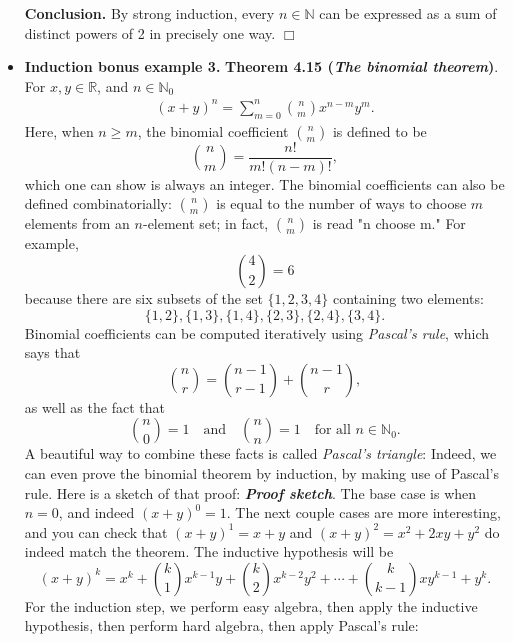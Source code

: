 \documentclass{report}
\begin{document}
\begin{itemize}
            \bigbreak \noindent 
            \textbf{Conclusion.} By strong induction, every \( n \in \mathbb{N} \) can be expressed as a sum of distinct powers of 2 in precisely one way. \(\Box\)
        \item \textbf{Induction bonus example 3.}
            \bigbreak \noindent 
            \textbf{Theorem 4.15 (\textit{The binomial theorem})}. For $x,y \in \mathbb{R}$, and $n\in \mathbb{N}_{0} $
            \begin{align*}
                (x+y)^{n} = \sum_{m=0}^{n}\binom{n}{m} x^{n-m}y^{m}
            .\end{align*}
            Here, when $n \geq m$, the binomial coefficient $\binom{n}{m}$ is defined to be 
            \[
                \binom{n}{m} = \frac{n!}{m!(n-m)!},
            \]
            which one can show is always an integer. The binomial coefficients can also be defined combinatorially: $\binom{n}{m}$ is equal to the number of ways to choose $m$ elements from an $n$-element set; in fact, $\binom{n}{m}$ is read "n choose m." For example, 
            \[
                \binom{4}{2} = 6
            \]
            because there are six subsets of the set $\{1, 2, 3, 4\}$ containing two elements:
            \[
                \{1, 2\}, \{1, 3\}, \{1, 4\}, \{2, 3\}, \{2, 4\}, \{3, 4\}.
            \]
            Binomial coefficients can be computed iteratively using \textit{Pascal's rule}, which says that
            \[
                \binom{n}{r} = \binom{n-1}{r-1} + \binom{n-1}{r},
            \]
            as well as the fact that
            \[
                \binom{n}{0} = 1 \quad \text{and} \quad \binom{n}{n} = 1 \quad \text{for all } n \in \mathbb{N}_0.
            \]
            A beautiful way to combine these facts is called \textit{Pascal's triangle}:
            \bigbreak \noindent 
            \bigbreak \noindent 
            Indeed, we can even prove the binomial theorem by induction, by making use of Pascal’s rule. Here is a sketch of that proof:
            \bigbreak \noindent 
            \textbf{\textit{Proof sketch}}. The base case is when $n = 0$, and indeed $(x + y)^0 = 1$. The next couple cases are more interesting, and you can check that $(x + y)^1 = x + y$ and $(x + y)^2 = x^2 + 2xy + y^2$ do indeed match the theorem. The inductive hypothesis will be
            \[
                (x + y)^k = x^k + \binom{k}{1}x^{k-1}y + \binom{k}{2}x^{k-2}y^2 + \cdots + \binom{k}{k-1}xy^{k-1} + y^k.
            \]
            For the induction step, we perform easy algebra, then apply the inductive hypothesis, then perform hard algebra, then apply Pascal's rule:

\end{itemize}
\end{document}
